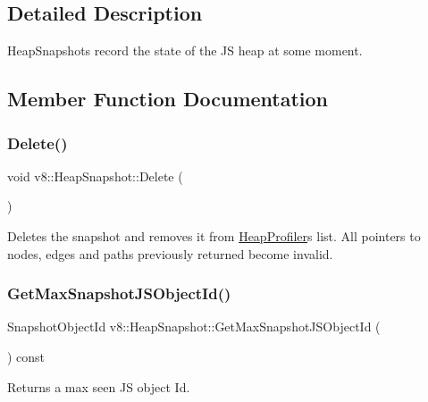 \subsection{Detailed Description}
Heap\+Snapshots record the state of the JS heap at some moment. 

\subsection{Member Function Documentation}
\mbox{\label{classv8_1_1HeapSnapshot_aeaa6073009e4041839dff7a860d2548a}} 
\subsubsection{\texorpdfstring{Delete()}{Delete()}}
{\footnotesize\ttfamily void v8\+::\+Heap\+Snapshot\+::\+Delete (\begin{DoxyParamCaption}{ }\end{DoxyParamCaption})}

Deletes the snapshot and removes it from \mbox{\hyperlink{classv8_1_1HeapProfiler}{Heap\+Profiler}}\textquotesingle{}s list. All pointers to nodes, edges and paths previously returned become invalid. \mbox{\label{classv8_1_1HeapSnapshot_ab85fc78102f4e7a3c4f2bf66a3665908}} 
\subsubsection{\texorpdfstring{Get\+Max\+Snapshot\+J\+S\+Object\+Id()}{GetMaxSnapshotJSObjectId()}}
{\footnotesize\ttfamily Snapshot\+Object\+Id v8\+::\+Heap\+Snapshot\+::\+Get\+Max\+Snapshot\+J\+S\+Object\+Id (\begin{DoxyParamCaption}{ }\end{DoxyParamCaption}) const}

Returns a max seen JS object Id. \mbox{\label{classv8_1_1HeapSnapshot_ac5e9333d91030870b2648f2f8e9505d7}} 
